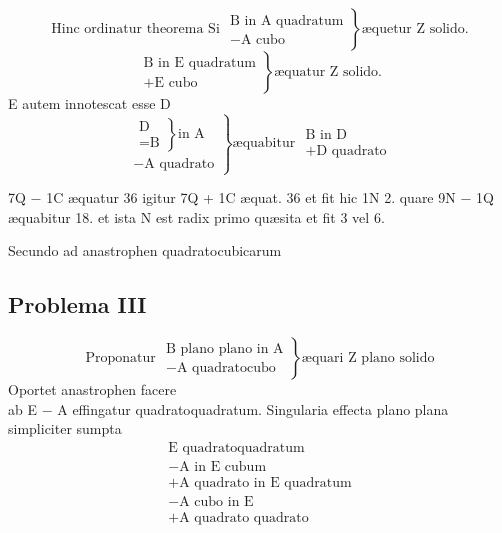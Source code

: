 \documentclass[11pt,a4paper]{article}
\begin{document}
\[ \text{Hinc ordinatur theorema Si } \left.\begin{array}{l} \text{B in A quadratum} \\ -\text{A cubo} \end{array}\right\} \text{æquetur Z solido.} \]
\[ \left.\begin{array}{l} \text{B in E quadratum} \\ +\text{E cubo} \end{array}\right\} \text{æquatur Z solido.} \]
E autem innotescat esse D
\[ \left.\begin{array}{l} \left.\begin{array}{l} \text{D} \\ =\text{B} \end{array}\right\} \text{in A} \\ -\text{A quadrato} \end{array}\right\} \text{æquabitur } \begin{array}{l} \text{B in D} \\ +\text{D quadrato} \end{array} \]
\marginal{+}

7Q $-$ 1C æquatur 36 igitur 7Q + 1C æquat. 36 et fit hic 1N 2. quare 9N $-$ 1Q æquabitur 18. et ista N est radix primo quæsita et fit 3 vel 6.

Secundo ad anastrophen quadratocubicarum

\subsection*{Problema III}

\[ \text{Proponatur } \left.\begin{array}{l} \text{B plano plano in A} \\ -\text{A quadratocubo} \end{array}\right\} \text{æquari Z plano solido} \]
Oportet anastrophen facere\\
ab E $-$ A effingatur quadratoquadratum. Singularia effecta plano plana simpliciter sumpta 
\[ \begin{array}{l} \text{E quadratoquadratum} \\ -\text{A in E cubum} \\ +\text{A quadrato in E quadratum} \\ -\text{A cubo in E} \\ +\text{A quadrato quadrato} \end{array} \]
\end{document}
